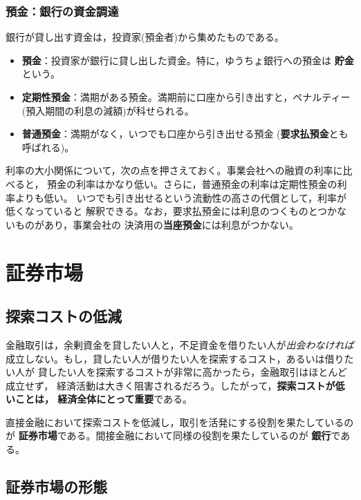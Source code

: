 \subsubsection{預金：銀行の資金調達}

銀行が貸し出す資金は，投資家(預金者)から集めたものである。

\begin{itemize}
\item \textbf{預金}：投資家が銀行に貸し出した資金。特に，ゆうちょ銀行への預金は
\textbf{貯金}という。
\item \textbf{定期性預金}：満期がある預金。満期前に口座から引き出すと，ペナルティー
(預入期間の利息の減額)が科せられる。
\item \textbf{普通預金}：満期がなく，いつでも口座から引き出せる預金
(\textbf{要求払預金}とも呼ばれる)。
\end{itemize}

利率の大小関係について，次の点を押さえておく。事業会社への融資の利率に比べると，
預金の利率はかなり低い。さらに，普通預金の利率は定期性預金の利率よりも低い。
いつでも引き出せるという流動性の高さの代償として，利率が低くなっていると
解釈できる。なお，要求払預金には利息のつくものとつかないものがあり，事業会社の
決済用の\textbf{当座預金}には利息がつかない。

\section{証券市場}

\subsection{探索コストの低減}

金融取引は，余剰資金を貸したい人と，不足資金を借りたい人が\emph{出会わなければ}
成立しない。もし，貸したい人が借りたい人を探索するコスト，あるいは借りたい人が
貸したい人を探索するコストが非常に高かったら，金融取引はほとんど成立せず，
経済活動は大きく阻害されるだろう。したがって，\textbf{探索コストが低いことは，
経済全体にとって重要}である。

\begin{keypoint}[市場と銀行の役割]
直接金融において探索コストを低減し，取引を活発にする役割を果たしているのが
\textbf{証券市場}である。間接金融において同様の役割を果たしているのが
\textbf{銀行}である。
\end{keypoint}

\subsection{証券市場の形態}

